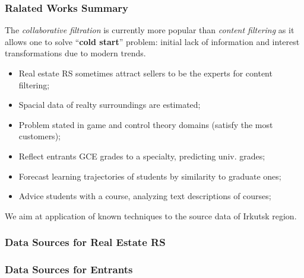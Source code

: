 \documentclass[10pt,dvipsnames]{beamer}
\begin{document}
\begin{frame}
  \frametitle{Ralated Works Summary}
  The \emph{collaborative filtration} is currently more popular than \emph{content filtering} as it allows one to solve ``\textbf{cold start}'' problem: initial lack of information and interest transformations due to modern trends.
  \begin{itemize}
  \item Real estate RS sometimes attract sellers to be the experts for content filtering;
  \item Spacial data of realty surroundings are estimated;
  \item Problem stated in game and control theory domains (satisfy the most customers);
  \item Reflect entrants GCE grades to a specialty, predicting univ. grades;
  \item Forecast learning trajectories of students by similarity to graduate ones;
  \item Advice students with a course, analyzing text descriptions of courses;
  \end{itemize}

  We aim at application of known techniques to the source data of Irkutsk region.
\end{frame}

\begin{frame}
  \frametitle{Data Sources for Real Estate RS}

\end{frame}

\begin{frame}
  \frametitle{Data Sources for Entrants}
\end{frame}
\end{document}
